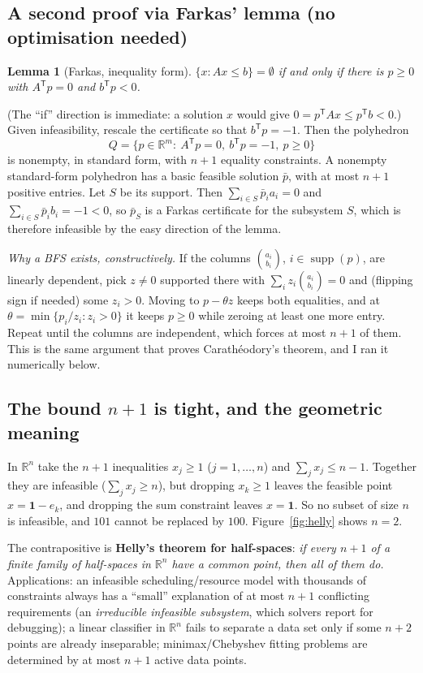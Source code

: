 \documentclass[11pt]{article}
\newcommand{\R}{\mathbb{R}}
\newcommand{\T}{^{\mathsf T}}
\newcommand{\ones}{\mathbf{1}}
\newtheorem*{lemma*}{Lemma}
\begin{document}
\subsection*{A second proof via Farkas' lemma (no optimisation needed)}
\begin{lemma*}[Farkas, inequality form]
$\{x:Ax\le b\}=\emptyset$ if and only if there is $p\ge0$ with $A\T p=0$ and $b\T p<0$.
\end{lemma*}
\noindent(The ``if'' direction is immediate: a solution $x$ would give $0=p\T Ax\le p\T b<0$.) Given infeasibility, rescale the certificate so that $b\T p=-1$. Then the polyhedron
\[
Q=\{p\in\R^m:\ A\T p=0,\ b\T p=-1,\ p\ge0\}
\]
is nonempty, in standard form, with $n+1$ equality constraints. A nonempty standard-form polyhedron has a basic feasible solution $\bar p$, with at most $n+1$ positive entries. Let $S$ be its support. Then $\sum_{i\in S}\bar p_ia_i=0$ and $\sum_{i\in S}\bar p_ib_i=-1<0$, so $\bar p_S$ is a Farkas certificate for the subsystem $S$, which is therefore infeasible by the easy direction of the lemma.

\emph{Why a BFS exists, constructively.} If the columns $\binom{a_i}{b_i}$, $i\in\operatorname{supp}(p)$, are linearly dependent, pick $z\ne0$ supported there with $\sum_iz_i\binom{a_i}{b_i}=0$ and (flipping sign if needed) some $z_i>0$. Moving to $p-\theta z$ keeps both equalities, and at $\theta=\min\{p_i/z_i:z_i>0\}$ it keeps $p\ge0$ while zeroing at least one more entry. Repeat until the columns are independent, which forces at most $n+1$ of them. This is the same argument that proves Carath\'eodory's theorem, and I ran it numerically below.

\subsection*{The bound $n+1$ is tight, and the geometric meaning}
In $\R^n$ take the $n+1$ inequalities $x_j\ge1$ ($j=1,\dots,n$) and $\sum_jx_j\le n-1$. Together they are infeasible ($\sum_j x_j\ge n$), but dropping $x_k\ge1$ leaves the feasible point $x=\ones-e_k$, and dropping the sum constraint leaves $x=\ones$. So no subset of size $n$ is infeasible, and $101$ cannot be replaced by $100$. Figure~\ref{fig:helly} shows $n=2$.

The contrapositive is \textbf{Helly's theorem for half-spaces}: \emph{if every $n+1$ of a finite family of half-spaces in $\R^n$ have a common point, then all of them do.} Applications: an infeasible scheduling/resource model with thousands of constraints always has a ``small'' explanation of at most $n+1$ conflicting requirements (an \emph{irreducible infeasible subsystem}, which solvers report for debugging); a linear classifier in $\R^n$ fails to separate a data set only if some $n+2$ points are already inseparable; minimax/Chebyshev fitting problems are determined by at most $n+1$ active data points.
\end{document}
